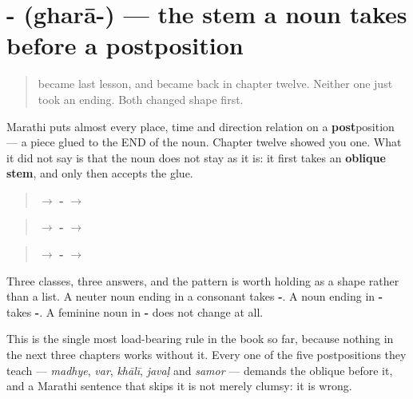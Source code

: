 \section[\texorpdfstring{\mr{घरा}- (gharā-)}{घरा- (gharā-)}]{- (gharā-) — the stem a noun takes before a postposition}

\label{lesson:MR-C41-oblique}



\begin{quote}
\textbf{} became \textbf{} last lesson, and \textbf{} became \textbf{} back in chapter twelve. Neither one just took an ending. Both changed shape first.
\end{quote}

\begin{grammarlens}[title={Grammar Lens: the noun bends before anything is glued to it}]
Marathi puts almost every place, time and direction relation on a \textbf{post}position — a piece glued to the END of the noun. Chapter twelve showed you one. What it did not say is that the noun does not stay as it is: it first takes an \textbf{oblique stem}, and only then accepts the glue.

\begin{quote}
\textbf{} $\to$ \textbf{-} $\to$ \textbf{}
\end{quote}

\begin{quote}
\textbf{} $\to$ \textbf{-} $\to$ \textbf{}
\end{quote}

\begin{quote}
\textbf{} $\to$ \textbf{-} $\to$ \textbf{}
\end{quote}

Three classes, three answers, and the pattern is worth holding as a shape rather than a list. A neuter noun ending in a consonant takes \textbf{-}. A noun ending in \textbf{-} takes \textbf{-}. A feminine noun in \textbf{-} does not change at all.

This is the single most load-bearing rule in the book so far, because nothing in the next three chapters works without it. Every one of the five postpositions they teach — \emph{madhye}, \emph{var}, \emph{khālī}, \emph{javaḷ} and \emph{samor} — demands the oblique before it, and a Marathi sentence that skips it is not merely clumsy: it is wrong.
\end{grammarlens}

